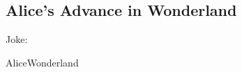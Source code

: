 
\subsection{Alice's Advance in Wonderland\cite{AliceWonderland}}

Joke: 

\ifdetail
{{AliceWonderland} }
\fi

